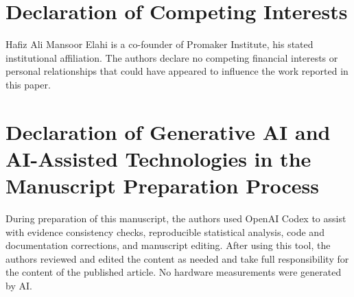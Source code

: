 \documentclass[journal, 10pt]{IEEEtran}
\begin{document}
\section*{Declaration of Competing Interests}
Hafiz Ali Mansoor Elahi is a co-founder of Promaker Institute, his stated institutional affiliation. The authors declare no competing financial interests or personal relationships that could have appeared to influence the work reported in this paper.

\section*{Declaration of Generative AI and AI-Assisted Technologies in the Manuscript Preparation Process}
During preparation of this manuscript, the authors used OpenAI Codex to assist with evidence consistency checks, reproducible statistical analysis, code and documentation corrections, and manuscript editing. After using this tool, the authors reviewed and edited the content as needed and take full responsibility for the content of the published article. No hardware measurements were generated by AI.
\end{document}
